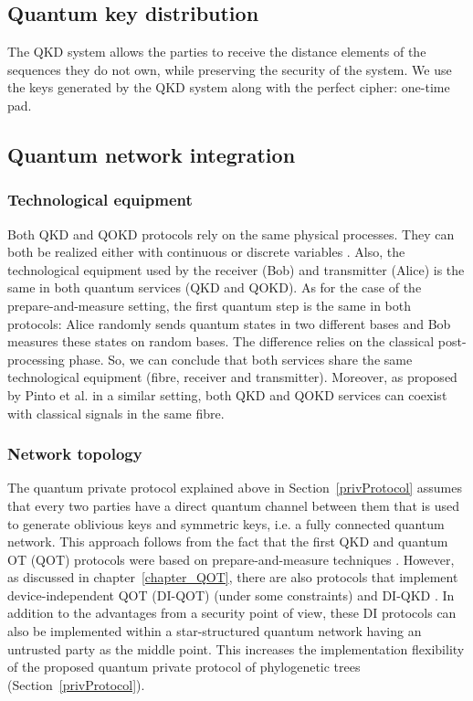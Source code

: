 \subsection{Quantum key distribution} 

The QKD system allows the parties to receive the distance elements of the sequences they do not own, while preserving the security of the system. We use the keys generated by the QKD system along with the perfect cipher: one-time pad. %


\subsection{Quantum network integration}

\subsubsection{Technological equipment}

Both QKD and QOKD protocols rely on the same physical processes. They can both be realized either with continuous or discrete variables \cite{Pirandola2020,Silva2019,FGSPSW18, Lemus20}. Also, the technological equipment used by the receiver (Bob) and transmitter (Alice) is the same in both quantum services (QKD and QOKD). As for the case of the prepare-and-measure setting, the first quantum step is the same in both protocols: Alice randomly sends quantum states in two different bases and Bob measures these states on random bases. The difference relies on the classical post-processing phase. So, we can conclude that both services share the same technological equipment (fibre, receiver and transmitter). Moreover, as proposed by Pinto et al. \cite{Pinto2020} in a similar setting, both QKD and QOKD services can coexist with classical signals in the same fibre.

\subsubsection{Network topology}

The quantum private protocol explained above in Section~\ref{privProtocol} assumes that every two parties have a direct quantum channel between them that is used to generate oblivious keys and symmetric keys, i.e. a fully connected quantum network. This approach follows from the fact that the first QKD and quantum OT (QOT) protocols were based on prepare-and-measure techniques \cite{BB84, BBCS92}. However, as discussed in chapter~\ref{chapter_QOT}, there are also protocols that implement device-independent QOT (DI-QOT) \cite{KW16, RW20} (under some constraints) and DI-QKD \cite{Pirandola2020}. In addition to the advantages from a security point of view, these DI protocols can also be implemented within a star-structured quantum network having an untrusted party as the middle point. This increases the implementation flexibility of the proposed quantum private protocol of phylogenetic trees (Section~\ref{privProtocol}).

